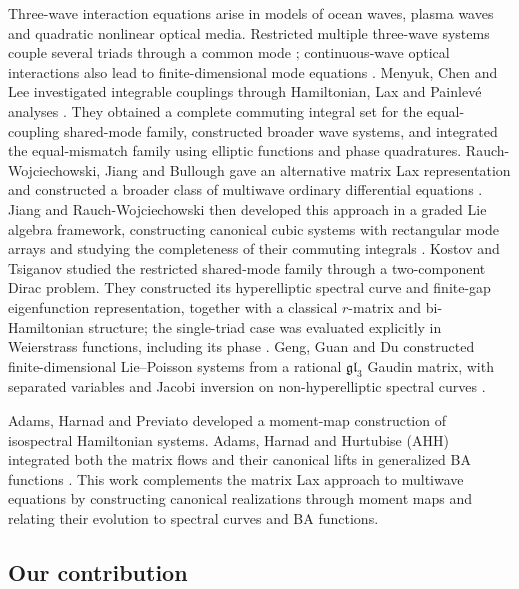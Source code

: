 Three-wave interaction equations arise in models of ocean waves,
plasma waves and quadratic nonlinear optical media. Restricted
multiple three-wave systems couple several triads through a common
mode \cite{KostovTsiganov2008}; continuous-wave optical interactions
also lead to finite-dimensional mode equations \cite{Hesketh2015}.
Menyuk, Chen and Lee investigated integrable couplings through
Hamiltonian, Lax and Painlev\'e analyses
\cite{MenyukChenLee1982,MenyukChenLee1983Integrable,
MenyukChenLee1983Painleve}. They obtained a complete commuting
integral set for the equal-coupling shared-mode family, constructed
broader wave systems, and integrated the equal-mismatch family
using elliptic functions and phase quadratures.
Rauch-Wojciechowski, Jiang and Bullough gave an alternative matrix
Lax representation and constructed a broader class of multiwave
ordinary differential equations \cite{WJB1986}. Jiang and
Rauch-Wojciechowski then developed this approach in a graded Lie
algebra framework, constructing canonical cubic systems with
rectangular mode arrays and studying the completeness of their
commuting integrals \cite{JRW1991}.
Kostov and Tsiganov studied the restricted shared-mode family through
a two-component Dirac problem. They constructed its hyperelliptic
spectral curve and finite-gap eigenfunction representation, together
with a classical $r$-matrix and bi-Hamiltonian structure; the
single-triad case was evaluated explicitly in Weierstrass functions,
including its phase \cite{KostovTsiganov2008}.
Geng, Guan and Du constructed finite-dimensional Lie--Poisson
systems from a rational $\mathfrak{gl}_3$ Gaudin matrix, with separated
variables and Jacobi inversion on non-hyperelliptic spectral curves
\cite[Sections~3--5]{GengGuanDu2022}.

Adams, Harnad and Previato developed a moment-map
construction of isospectral Hamiltonian systems. Adams, Harnad and
Hurtubise (AHH) integrated both
the matrix flows and their canonical lifts in generalized BA functions
\cite{AdamsHarnadPreviato1988,AdamsHarnadHurtubise1990II}.
This work complements the matrix Lax approach to multiwave equations
by constructing canonical realizations through moment maps and
relating their evolution to spectral curves and BA functions.

\subsection{Our contribution}


